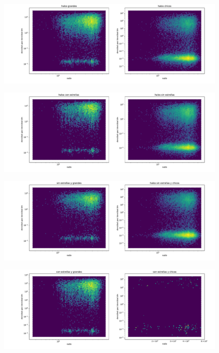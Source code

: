 \begin{figure}[h]
\centering
\includegraphics[width=18cm]{Figures/S_sctFRACC1.pdf}
\decoRule
\caption[perfil del void R]{}
\label{fig:Electron}
\end{figure}
\begin{figure}[h]
\centering
\includegraphics[width=18cm]{Figures/S_sctFRACC2.pdf}
\decoRule
\caption[perfil del void R]{}
\label{fig:Electron}
\end{figure}
\begin{figure}[h]
\centering
\includegraphics[width=18cm]{Figures/S_sctFRACC3.pdf}
\decoRule
\caption[perfil del void R]{}
\label{fig:Electron}
\end{figure}
\begin{figure}[h]
\centering
\includegraphics[width=18cm]{Figures/S_sctFRACC4.pdf}
\decoRule
\caption[perfil del void R]{}
\label{fig:Electron}
\end{figure}




